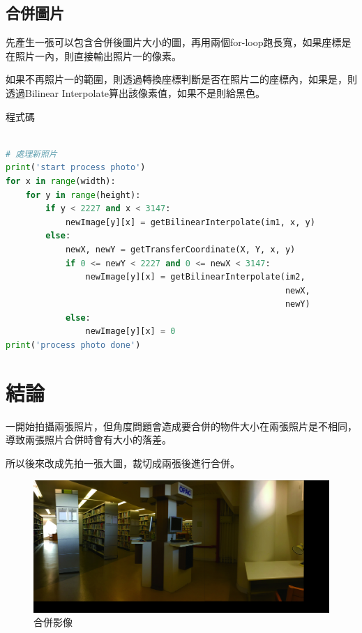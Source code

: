 \documentclass[12pt,a4paper]{article}
\begin{document}
\subsection{合併圖片}

{
先產生一張可以包含合併後圖片大小的圖，再用兩個for-loop跑長寬，如果座標是在照片一內，則直接輸出照片一的像素。

如果不再照片一的範圍，則透過轉換座標判斷是否在照片二的座標內，如果是，則透過Bilinear Interpolate算出該像素值，如果不是則給黑色。

程式碼
\begin{lstlisting}[language=Python]

# 處理新照片
print('start process photo')
for x in range(width):
    for y in range(height):
        if y < 2227 and x < 3147:
            newImage[y][x] = getBilinearInterpolate(im1, x, y)
        else:
            newX, newY = getTransferCoordinate(X, Y, x, y)
            if 0 <= newY < 2227 and 0 <= newX < 3147:
                newImage[y][x] = getBilinearInterpolate(im2, 
                										newX,
                										newY)
            else:
                newImage[y][x] = 0
print('process photo done')
\end{lstlisting}
}

\section{結論}

一開始拍攝兩張照片，但角度問題會造成要合併的物件大小在兩張照片是不相同，導致兩張照片合併時會有大小的落差。

所以後來改成先拍一張大圖，裁切成兩張後進行合併。
\begin{figure}[ht]
\centering
\includegraphics[width=1\textwidth]{image/combineBilinearPhoto.jpg}
\caption{合併影像}%
\label{合併影像}%
\end{figure}
\end{document}
